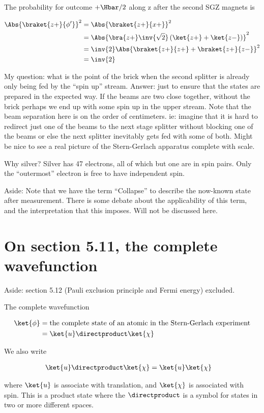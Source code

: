The probability for outcome \(+\Hbar/2\) along z after the second SGZ magnets is

\begin{equation}\label{eqn:lecture7sternGerlach:240}
\begin{aligned}
\Abs{\braket{z+}{\phi'}}^2
&=
\Abs{\braket{z+}{x+}}^2 \\
&=
\Abs{\bra{z+} \inv{\sqrt{2}} \left( \ket{z+} + \ket{z-} \right) }^2 \\
&=
\inv{2}
\Abs{\braket{z+}{z+} + \braket{z+}{z-} }^2 \\
&=
\inv{2}
\end{aligned}
\end{equation}

My question: what is the point of the brick when the second splitter is already only being fed by the ``spin up'' stream.  Answer: just to ensure that the states are prepared in the expected way.  If the beams are two close together, without the brick perhaps we end up with some spin up in the upper stream.  Note that the beam separation here is on the order of centimeters.  ie: imagine that it is hard to redirect just one of the beams to the next stage splitter without blocking one of the beams or else the next splitter inevitably gets fed with some of both.  Might be nice to see a real picture of the Stern-Gerlach apparatus complete with scale.

Why silver?  Silver has 47 electrons, all of which but one are in spin pairs.  Only the ``outermost'' electron is free to have independent spin.

Aside: Note that we have the term ``Collapse'' to describe the now-known state after measurement.  There is some debate about the applicability of this term, and the interpretation that this imposes.  Will not be discussed here.

\section{On section 5.11, the complete wavefunction}

Aside: section 5.12 (Pauli exclusion principle and Fermi energy) excluded.

The complete wavefunction

\begin{equation}\label{eqn:lecture7sternGerlach:260}
\begin{aligned}
\ket{\phi} &= \text{the complete state of an atomic in the Stern-Gerlach experiment} \\
&=
\ket{u} \directproduct \ket{\chi}
\end{aligned}
\end{equation}

We also write

\begin{equation}\label{eqn:PHY356Foct26:200}
\begin{aligned}
\ket{u} \directproduct \ket{\chi}  &= \ket{u} \ket{\chi}
\end{aligned}
\end{equation}

where \(\ket{u}\) is associate with translation, and \(\ket{\chi}\) is associated with spin.  This is a product state where the \(\directproduct\) is a symbol for states in two or more different spaces.
